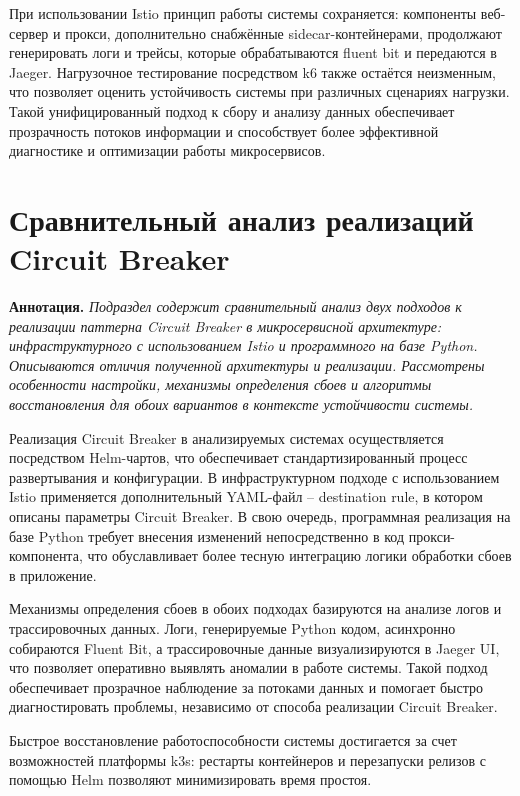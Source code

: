 При использовании Istio принцип работы системы сохраняется: компоненты веб-сервер и прокси, дополнительно снабжённые sidecar-контейнерами, продолжают генерировать логи и трейсы, которые обрабатываются fluent bit и передаются в Jaeger. Нагрузочное тестирование посредством k6 также остаётся неизменным, что позволяет оценить устойчивость системы при различных сценариях нагрузки. Такой унифицированный подход к сбору и анализу данных обеспечивает прозрачность потоков информации и способствует более эффективной диагностике и оптимизации работы микросервисов.
  
\section{Сравнительный анализ реализаций Circuit Breaker}
  
\textbf{Аннотация.} \textit{Подраздел содержит сравнительный анализ двух подходов к реализации паттерна Circuit Breaker в микросервисной архитектуре: инфраструктурного с использованием Istio и программного на базе Python. Описываются отличия полученной архитектуры и реализации. Рассмотрены особенности настройки, механизмы определения сбоев и алгоритмы восстановления для обоих вариантов в контексте устойчивости системы.}

Реализация Circuit Breaker в анализируемых системах осуществляется посредством Helm-чартов, что обеспечивает стандартизированный процесс развертывания и конфигурации. В инфраструктурном подходе с использованием Istio применяется дополнительный YAML-файл – destination rule, в котором описаны параметры Circuit Breaker. В свою очередь, программная реализация на базе Python требует внесения изменений непосредственно в код прокси-компонента, что обуславливает более тесную интеграцию логики обработки сбоев в приложение.

Механизмы определения сбоев в обоих подходах базируются на анализе логов и трассировочных данных. Логи, генерируемые Python кодом, асинхронно собираются Fluent Bit, а трассировочные данные визуализируются в Jaeger UI, что позволяет оперативно выявлять аномалии в работе системы. Такой подход обеспечивает прозрачное наблюдение за потоками данных и помогает быстро диагностировать проблемы, независимо от способа реализации Circuit Breaker.

Быстрое восстановление работоспособности системы достигается за счет возможностей платформы k3s: рестарты контейнеров и перезапуски релизов с помощью Helm позволяют минимизировать время простоя. 

